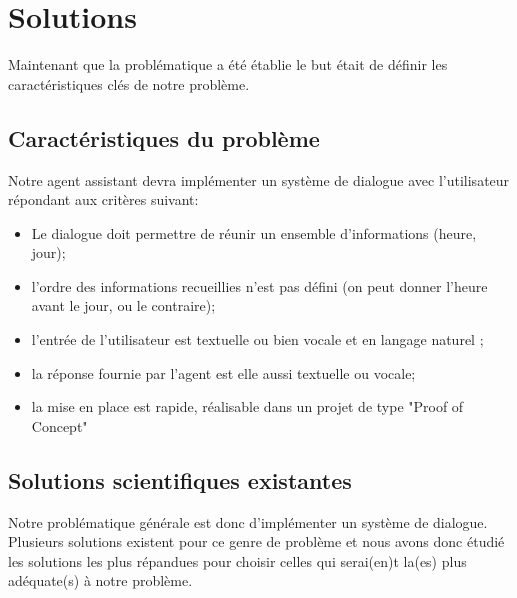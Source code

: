 \chapter{Solutions}

Maintenant que la problématique a été établie le but était de définir les caractéristiques clés de notre problème.


\section{Caractéristiques du problème}
Notre agent assistant devra implémenter un système de dialogue avec l'utilisateur répondant aux critères suivant:
\begin{itemize}
	\item Le dialogue doit permettre de réunir un ensemble d'informations (heure, jour);
 	\item l'ordre des informations recueillies n'est pas défini (on peut donner l'heure avant le jour, ou le contraire);
 	\item l'entrée de l'utilisateur est textuelle ou bien vocale et en langage naturel ;
 	\item la réponse fournie par l'agent est elle aussi textuelle ou vocale;
 	\item la mise en place est rapide, réalisable dans un projet de type "Proof of Concept"
\end{itemize}

\section{Solutions scientifiques existantes}
Notre problématique générale est donc d'implémenter un système de dialogue. Plusieurs solutions existent pour ce genre de problème et nous avons donc étudié les solutions les plus répandues pour choisir celles qui serai(en)t la(es) plus adéquate(s) à notre problème.

